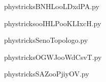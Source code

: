     

    \clearpage
    


    \newcommand{\CaptionFigBNHLooLDxdPA}{<+Type your caption here+>}
    \begin{center}
        
    \end{center}
    phystricksBNHLooLDxdPA.py

    

    \clearpage
    


    \newcommand{\CaptionFigooIHLPooKLIxcH}{<+Type your caption here+>}
    \begin{center}
        
    \end{center}
    phystricksooIHLPooKLIxcH.py

    

    \clearpage
    


    \newcommand{\CaptionFigSenoTopologo}{<+Type your caption here+>}
    \begin{center}
        
    \end{center}
    phystricksSenoTopologo.py

    

    \clearpage
    


    \newcommand{\CaptionFigOGWJooWdCsvT}{<+Type your caption here+>}
    \begin{center}
        
    \end{center}
    phystricksOGWJooWdCsvT.py

    

    \clearpage
    


    \newcommand{\CaptionFigSAZooPjiyOV}{<+Type your caption here+>}
    \begin{center}
        
    \end{center}
    phystricksSAZooPjiyOV.py

    

    \clearpage
    


